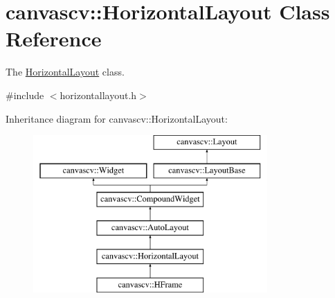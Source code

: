 \hypertarget{classcanvascv_1_1HorizontalLayout}{}\section{canvascv\+:\+:Horizontal\+Layout Class Reference}
\label{classcanvascv_1_1HorizontalLayout}


The \hyperlink{classcanvascv_1_1HorizontalLayout}{Horizontal\+Layout} class.  




{\ttfamily \#include $<$horizontallayout.\+h$>$}

Inheritance diagram for canvascv\+:\+:Horizontal\+Layout\+:\begin{figure}[H]
\begin{center}
\leavevmode
\includegraphics[height=6.000000cm]{classcanvascv_1_1HorizontalLayout}
\end{center}
\end{figure}

